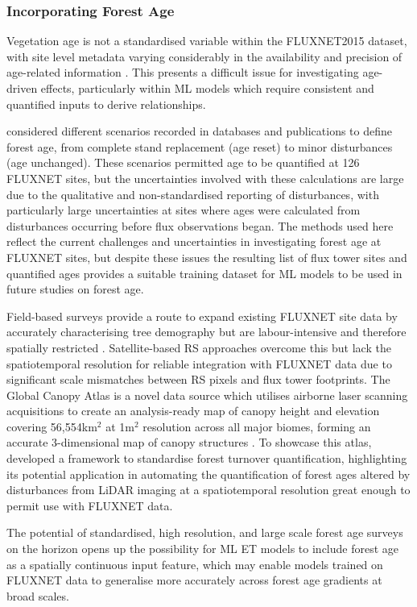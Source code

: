 \subsubsection{Incorporating Forest Age} 
Vegetation age is not a standardised variable within the FLUXNET2015 dataset, with site level metadata varying considerably in the availability and precision of age-related information \parencite{pastorello2020fluxnet2015}. This presents a difficult issue for investigating age-driven effects, particularly within ML models which require consistent and quantified inputs to derive relationships. 
\par \textcite{besnard2018} considered different scenarios recorded in databases and publications to define forest age, from complete stand replacement (age reset) to minor disturbances (age unchanged). These scenarios permitted age to be quantified at 126 FLUXNET sites, but the uncertainties involved with these calculations are large due to the qualitative and non-standardised reporting of disturbances, with particularly large uncertainties at sites where ages were calculated from disturbances occurring before flux observations began. The methods used here reflect the current challenges and uncertainties in investigating forest age at FLUXNET sites, but despite these issues the resulting list of flux tower sites and quantified ages provides a suitable training dataset for ML models to be used in future studies on forest age.
\par Field-based surveys provide a route to expand existing FLUXNET site data by accurately characterising tree demography but are labour-intensive and therefore spatially restricted \parencite{battison2024tracking}. Satellite-based RS approaches overcome this but lack the spatiotemporal resolution for reliable integration with FLUXNET data due to significant scale mismatches between RS pixels and flux tower footprints. The Global Canopy Atlas is a novel data source which utilises airborne laser scanning acquisitions to create an analysis-ready map of canopy height and elevation covering 56,554km$^2$ at 1m$^2$ resolution across all major biomes, forming an accurate 3-dimensional map of canopy structures \parencite{fischer2025global}. To showcase this atlas, \textcite{fischer2025global} developed a framework to standardise forest turnover quantification, highlighting its potential application in automating the quantification of forest ages altered by disturbances from LiDAR imaging at a spatiotemporal resolution great enough to permit use with FLUXNET data.
\par The potential of standardised, high resolution, and large scale forest age surveys on the horizon opens up the possibility for ML ET models to include forest age as a spatially continuous input feature, which may enable models trained on FLUXNET data to generalise more accurately across forest age gradients at broad scales. 

